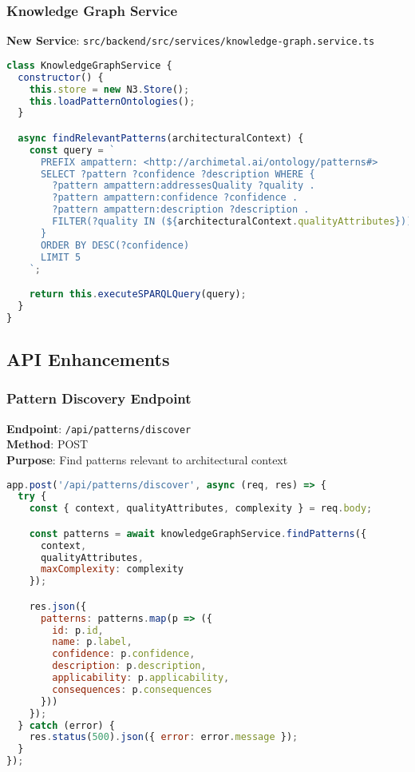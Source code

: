\documentclass[12pt,a4paper]{article}
\begin{document}
\subsubsection{Knowledge Graph Service}
\textbf{New Service}: \texttt{src/backend/src/services/knowledge-graph.service.ts}

\begin{lstlisting}[language=JavaScript,caption=Knowledge Graph Service]
class KnowledgeGraphService {
  constructor() {
    this.store = new N3.Store();
    this.loadPatternOntologies();
  }

  async findRelevantPatterns(architecturalContext) {
    const query = `
      PREFIX ampattern: <http://archimetal.ai/ontology/patterns#>
      SELECT ?pattern ?confidence ?description WHERE {
        ?pattern ampattern:addressesQuality ?quality .
        ?pattern ampattern:confidence ?confidence .
        ?pattern ampattern:description ?description .
        FILTER(?quality IN (${architecturalContext.qualityAttributes}))
      }
      ORDER BY DESC(?confidence)
      LIMIT 5
    `;

    return this.executeSPARQLQuery(query);
  }
}
\end{lstlisting}

\subsection{API Enhancements}

\subsubsection{Pattern Discovery Endpoint}
\textbf{Endpoint}: \texttt{/api/patterns/discover}\\
\textbf{Method}: POST\\
\textbf{Purpose}: Find patterns relevant to architectural context

\begin{lstlisting}[language=JavaScript,caption=Pattern Discovery API]
app.post('/api/patterns/discover', async (req, res) => {
  try {
    const { context, qualityAttributes, complexity } = req.body;

    const patterns = await knowledgeGraphService.findPatterns({
      context,
      qualityAttributes,
      maxComplexity: complexity
    });

    res.json({
      patterns: patterns.map(p => ({
        id: p.id,
        name: p.label,
        confidence: p.confidence,
        description: p.description,
        applicability: p.applicability,
        consequences: p.consequences
      }))
    });
  } catch (error) {
    res.status(500).json({ error: error.message });
  }
});
\end{lstlisting}
\end{document}
